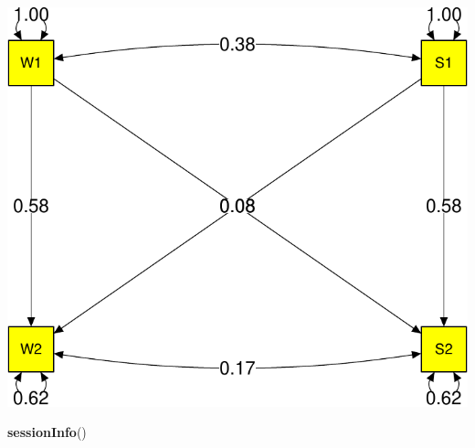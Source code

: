 \documentclass[]{article}
\newenvironment{Shaded}{\begin{snugshade}}{\end{snugshade}}
\newcommand{\KeywordTok}[1]{\textcolor[rgb]{0.13,0.29,0.53}{\textbf{#1}}}
\newcommand{\NormalTok}[1]{#1}
\begin{document}
\includegraphics{Supplemental_materials_1_files/figure-latex/unnamed-chunk-3-2.pdf}

\begin{Shaded}
\begin{Highlighting}[]
\KeywordTok{sessionInfo}\NormalTok{()}
\end{Highlighting}
\end{Shaded}
\end{document}
